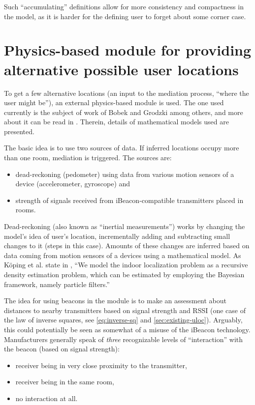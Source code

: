 Such ``accumulating'' definitions allow for more consistency and compactness in the model, as it is harder for the defining user to forget about some corner case.

\section{Physics-based module for providing alternative possible user locations}
\label{sec:physics-module}

To get a few alternative locations (an input to the mediation process, ``where the user might be''), an external physics-based module is used. The one used currently is the subject of work of Bobek and Grodzki among others, and more about it can be read in \cite{bobek2015indoor, Koeping2015indoor}. Therein, details of mathematical models used are presented.

The basic idea is to use two sources of data. If inferred locations occupy more than one room, mediation is triggered. The sources are:

\begin{itemize}
	\item dead-reckoning (pedometer) using data from various motion sensors of a device (accelerometer, gyroscope) and
	\item strength of signals received from iBeacon-compatible transmitters placed in rooms.
\end{itemize}

Dead-reckoning (also known as ``inertial measurements'') works by changing the model's idea of user's location, incrementally adding and subtracting small changes to it (steps in this case). Amounts of these changes are inferred based on data coming from motion sensors of a devices using a mathematical model. As Köping et al. state in \cite{Koeping2015indoor}, ``We model the indoor localization problem as a recursive density estimation problem, which can be estimated by employing the Bayesian framework, namely particle filters.''

The idea for using beacons in the module is to make an assessment about distances to nearby transmitters based on signal strength and RSSI (one case of the law of inverse squares, see \cref{eq:inverse-sq} and \cref{sec:existing-uloc}). Arguably, this could potentially be seen as somewhat of a misuse of the iBeacon technology. Manufacturers generally speak of \emph{three} recognizable levels of ``interaction'' with the beacon (based on signal strength): \begin{itemize}
 	\item receiver being in very close proximity to the transmitter,
 	\item receiver being in the same room,
 	\item no interaction at all.
 \end{itemize}
 
